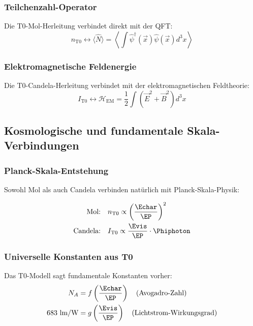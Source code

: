 	\subsubsection{Teilchenzahl-Operator}
	\label{subsubsec:teilchenzahl_operator}
	
	Die T0-Mol-Herleitung verbindet direkt mit der QFT:
	\begin{equation}
		n_{\text{T0}} \leftrightarrow \langle \hat{N} \rangle = \left\langle \int \hat{\psi}^\dagger(\vec{x}) \hat{\psi}(\vec{x}) d^3x \right\rangle
		\label{eq:mol_qft_verbindung}
	\end{equation}
	
	\subsubsection{Elektromagnetische Feldenergie}
	\label{subsubsec:em_feldenergie}
	
	Die T0-Candela-Herleitung verbindet mit der elektromagnetischen Feldtheorie:
	\begin{equation}
		I_{\text{T0}} \leftrightarrow \mathcal{H}_{\text{EM}} = \frac{1}{2}\int (\vec{E}^2 + \vec{B}^2) d^3x
		\label{eq:candela_em_verbindung}
	\end{equation}
	
	\subsection{Kosmologische und fundamentale Skala-Verbindungen}
	\label{subsec:kosmologische_verbindungen}
	
	\subsubsection{Planck-Skala-Entstehung}
	\label{subsubsec:planck_skala_entstehung}
	
	Sowohl Mol als auch Candela verbinden natürlich mit Planck-Skala-Physik:
	
	\begin{align}
		\text{Mol:} \quad &n_{\text{T0}} \propto \left(\frac{\Echar}{\EP}\right)^2 \\
		\text{Candela:} \quad &I_{\text{T0}} \propto \frac{\Evis}{\EP} \cdot \Phiphoton
	\end{align}
	
	\subsubsection{Universelle Konstanten aus T0}
	\label{subsubsec:universelle_konstanten_t0}
	
	Das T0-Modell sagt fundamentale Konstanten vorher:
	\begin{align}
		N_A &= f\left(\frac{\Echar}{\EP}\right) \quad \text{(Avogadro-Zahl)} \\
		683 \text{ lm/W} &= g\left(\frac{\Evis}{\EP}\right) \quad \text{(Lichtstrom-Wirkungsgrad)}
	\end{align}
